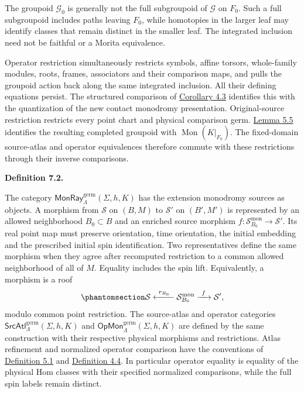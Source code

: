 \documentclass[
  english,
  11pt,
  reqno]{amsart}
\makeatletter
\newcommand{\pandocstatementheading}[1]{%
  \par\addpenalty{\@beginparpenalty}%
  \addvspace{.5\baselineskip plus .2\baselineskip minus .2\baselineskip}%
  {\normalfont\bfseries #1\par}%
  \nobreak\@afterindenttrue\@afterheading
}
\makeatother
\begin{document}
The groupoid \(\mathcal G_0\) is generally not the full subgroupoid of
\(\mathcal G\) on \(F_0\). Such a full subgroupoid includes paths
leaving \(F_0\), while homotopies in the larger leaf may identify
classes that remain distinct in the smaller leaf. The integrated
inclusion need not be faithful or a Morita equivalence.

Operator restriction simultaneously restricts symbols, affine torsors,
whole-family modules, roots, frames, associators and their comparison
maps, and pulls the groupoid action back along the same integrated
inclusion. All their defining equations persist. The structured
comparison of \hyperref[cor:null-monodromy-first-unit-v08]{Corollary
4.3} identifies this with the quantization of the new contact monodromy
presentation. Original-source restriction restricts every point chart
and physical comparison germ.
\hyperref[lem:source-atlas-phase-completion]{Lemma 5.5} identifies the
resulting completed groupoid with \(\operatorname{Mon}(K|_{F_0})\). The
fixed-domain source-atlas and operator equivalences therefore commute
with these restrictions through their inverse comparisons.

\pandocstatementheading{\protect{}\label{def:entire-real-source-germs-v08}Definition 7.2.}

The category \(\mathsf{MonRay}^{\mathrm{germ}}_\Lambda(\Sigma,h,K)\) has
the extension monodromy sources as objects. A morphism from
\(\mathcal S\) on \((B,M)\) to \(\mathcal S'\) on \((B',M')\) is
represented by an allowed neighborhood \(B_0\subset B\) and an enriched
source morphism \(f:\mathcal S^{\mathrm{mon}}_{B_0}\to\mathcal S'\). Its
real point map must preserve orientation, time orientation, the initial
embedding and the prescribed initial spin identification. Two
representatives define the same morphism when they agree after
recomputed restriction to a common allowed neighborhood of all of \(M\).
Equality includes the spin lift. Equivalently, a morphism is a roof
\begin{equation}\protect\phantomsection\label{eq:monodromy-germ-morphism-roof}{
\mathcal S
\xleftarrow{\ r_{B_0}\ }
\mathcal S^{\mathrm{mon}}_{B_0}
\xrightarrow{\ f\ }
\mathcal S',
}\end{equation} modulo common point restriction. The source-atlas and
operator categories
\(\mathsf{SrcAtl}^{\mathrm{germ}}_\Lambda(\Sigma,h,K)\) and
\(\mathsf{OpMon}^{\mathrm{germ}}_\Lambda(\Sigma,h,K)\) are defined by
the same construction with their respective physical morphisms and
restrictions. Atlas refinement and normalized operator comparison have
the conventions of
\hyperref[def:independent-original-source-atlas]{Definition 5.1} and
\hyperref[def:independent-operator-monodromy-source-v092]{Definition
4.4}. In particular operator equality is equality of the physical Hom
classes with their specified normalized comparisons, while the full spin
labels remain distinct.
\end{document}
